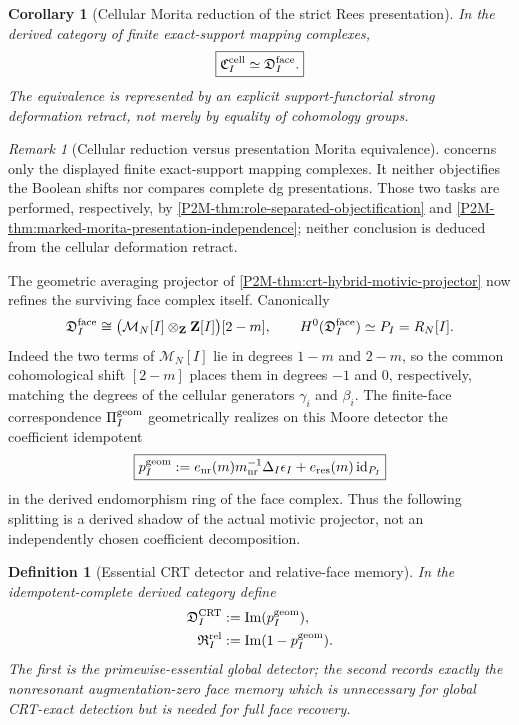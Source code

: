 \documentclass[11pt]{article}
\newtheorem{corollary}[theorem]{Corollary}
\newtheorem{definition}[theorem]{Definition}
\theoremstyle{remark}
\newtheorem{remark}[theorem]{Remark}
\newcommand{\Z}{\mathbf Z}
\begin{document}
\begin{corollary}[Cellular Morita reduction of the strict Rees presentation]
\label{P2M-cor:cellular-morita-reduction}
In the derived category of finite exact-support mapping complexes,
\begin{equation}
 \boxed{
 \mathfrak C_I^{\rm cell}\simeq\mathfrak D_I^{\rm face}.}
\end{equation}
The equivalence is represented by an explicit support-functorial strong
deformation retract, not merely by equality of cohomology groups.
\end{corollary}

\begin{remark}[Cellular reduction versus presentation Morita equivalence]
\label{P2M-rem:cellular-versus-presentation-morita}
 concerns only the displayed finite
exact-support mapping complexes.  It neither objectifies the Boolean shifts
nor compares complete dg presentations.  Those two tasks are performed,
respectively, by \cref{P2M-thm:role-separated-objectification} and
\cref{P2M-thm:marked-morita-presentation-independence}; neither conclusion is
deduced from the cellular deformation retract.
\end{remark}

The geometric averaging projector of
\cref{P2M-thm:crt-hybrid-motivic-projector} now refines the surviving face
complex itself.  Canonically
\[
 \mathfrak D_I^{\rm face}
 \cong
 \bigl(\mathcal M_N[I]\otimes_{\Z}\Z[I]\bigr)[2-m],
 \qquad
 H^0(\mathfrak D_I^{\rm face})\simeq P_I=R_N[I].
\]
Indeed the two terms of $\mathcal M_N[I]$ lie in degrees $1-m$ and
$2-m$, so the common cohomological shift $[2-m]$ places them in degrees
$-1$ and $0$, respectively, matching the degrees of the cellular generators
$\gamma_i$ and $\beta_i$.
The finite-face correspondence \(\Pi_I^{\rm geom}\) geometrically realizes on
this Moore detector the coefficient idempotent
\begin{equation}
 \boxed{
 p_I^{\rm geom}
 :=e_{\rm nr}(m)m_{\rm nr}^{-1}\Delta_I\epsilon_I
   +e_{\rm res}(m)\operatorname{id}_{P_I}}
\end{equation}
in the derived endomorphism ring of the face complex.  Thus the following
splitting is a derived shadow of the actual motivic projector, not an
independently chosen coefficient decomposition.

\begin{definition}[Essential CRT detector and relative-face memory]
\label{P2M-def:essential-crt-relative-face}
In the idempotent-complete derived category define
\begin{align}
 \mathfrak D_I^{\rm CRT}
 &:=\operatorname{Im}(p_I^{\rm geom}),
 \\
 \mathfrak R_I^{\rm rel}
 &:=\operatorname{Im}(1-p_I^{\rm geom}).
\end{align}
The first is the \emph{primewise-essential global detector}; the second records
exactly the nonresonant augmentation-zero face memory which is unnecessary for
global CRT-exact detection but is needed for full face recovery.
\end{definition}
\end{document}
